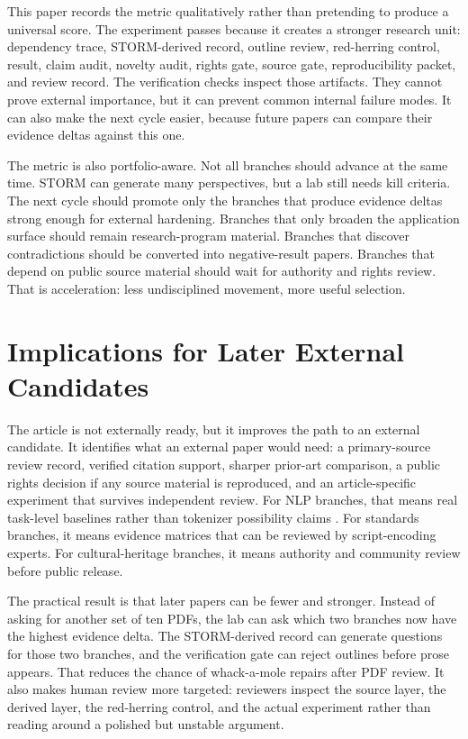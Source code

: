 \documentclass[sigconf,nonacm]{acmart}
\begin{document}
This paper records the metric qualitatively rather than pretending to produce a
universal score. The experiment passes because it creates a stronger research
unit: dependency trace, STORM-derived record, outline review, red-herring control, result,
claim audit, novelty audit, rights gate, source gate, reproducibility packet,
and review record. The verification checks inspect those artifacts. They cannot prove
external importance, but it can prevent common internal failure modes. It can
also make the next cycle easier, because future papers can compare their
evidence deltas against this one.

The metric is also portfolio-aware. Not all branches should advance at the same
time. STORM can generate many perspectives, but a lab still needs kill criteria.
The next cycle should promote only the branches that produce evidence deltas
strong enough for external hardening. Branches that only broaden the application
surface should remain research-program material. Branches that discover
contradictions should be converted into negative-result papers. Branches that
depend on public source material should wait for authority and rights review.
That is acceleration: less undisciplined movement, more useful selection.

\section{Implications for Later External Candidates}
The article is not externally ready, but it improves the path to an external
candidate. It identifies what an external paper would need: a primary-source
review record, verified citation support, sharper prior-art comparison, a public
rights decision if any source material is reproduced, and an article-specific
experiment that survives independent review. For NLP branches, that means real
task-level baselines rather than tokenizer possibility claims \cite{wadden2020scifact,gao2023alce,sennrich2016bpe,kudo2018sentencepiece,bostrom2020bytepair,rust2021tokenization}.
For standards branches, it means evidence matrices that can be reviewed by
script-encoding experts. For cultural-heritage branches, it means authority and
community review before public release.

The practical result is that later papers can be fewer and stronger. Instead of
asking for another set of ten PDFs, the lab can ask which two branches now have
the highest evidence delta. The STORM-derived record can generate questions for those two
branches, and the verification gate can reject outlines before prose appears. That
reduces the chance of whack-a-mole repairs after PDF review. It also makes
human review more targeted: reviewers inspect the source layer, the derived
layer, the red-herring control, and the actual experiment rather than reading
around a polished but unstable argument.
\end{document}
